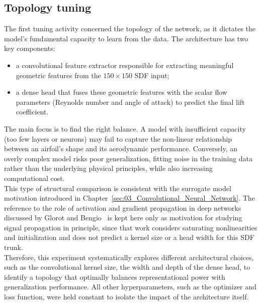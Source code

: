 \subsection{Topology tuning}
\label{sec:04_topology_tuning}

The first tuning activity concerned the topology of the network, as it dictates the model's fundamental capacity to learn from the data. The architecture has two key components:
\begin{itemize}
    \item[-] a convolutional feature extractor responsible for extracting meaningful geometric features from the $150\times150$ SDF input;
    \item[-] a dense head that fuses these geometric features with the scalar flow parameters (Reynolds number and angle of attack) to predict the final lift coefficient.
\end{itemize}
The main focus is to find the right balance. A model with insufficient capacity (too few layers or neurons) may fail to capture the non-linear relationship between an airfoil's shape and its aerodynamic performance. Conversely, an overly complex model risks poor generalization, fitting noise in the training data rather than the underlying physical principles, while also increasing computational cost.\\

This type of structural comparison is consistent with the surrogate model motivation introduced in Chapter~\ref{sec:03_Convolutional_Neural_Network}. The reference to the role of activation and gradient propagation in deep networks discussed by Glorot and Bengio~\cite{glorot2010understanding} is kept here only as motivation for studying signal propagation in principle, since that work considers saturating nonlinearities and initialization and does not predict a kernel size or a head width for this SDF trunk.\\

Therefore, this experiment systematically explores different architectural choices, such as the convolutional kernel size, the width and depth of the dense head, to identify a topology that optimally balances representational power with generalization performance. All other hyperparameters, such as the optimizer and loss function, were held constant to isolate the impact of the architecture itself.\\

